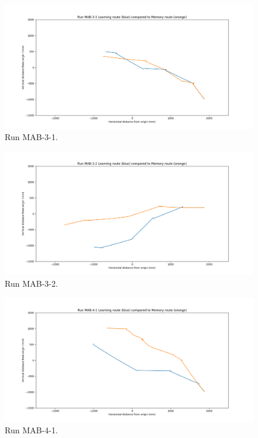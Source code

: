 \documentclass[a4paper,11pt,twoside,openright]{article}
\begin{document}
\begin{figure}[h!]
 \centering
  \includegraphics[width=\textwidth]{MAB-3-1}
  \caption{
    \label{fig:mab-3-1} Run MAB-3-1.
  }
\end{figure}

\begin{figure}[h!]
 \centering
  \includegraphics[width=\textwidth]{MAB-3-2}
  \caption{
    \label{fig:mab-3-2} Run MAB-3-2.
  }
\end{figure}

\begin{figure}[h!]
 \centering
  \includegraphics[width=\textwidth]{MAB-4-1}
  \caption{
    \label{fig:mab-4-1} Run MAB-4-1.
  }
\end{figure}
\end{document}
